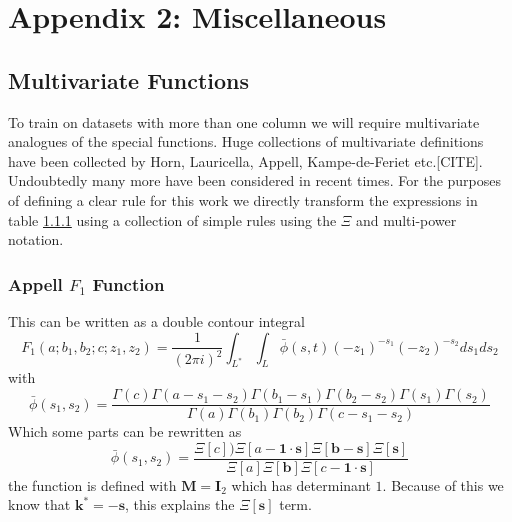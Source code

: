 \documentclass{article}
\begin{document}
\section{Appendix 2: Miscellaneous}
\subsection{Multivariate Functions}
To train on datasets with more than one column we will require multivariate analogues of the special functions. Huge collections of multivariate definitions have been collected by Horn, Lauricella, Appell, Kampe-de-Feriet etc.[CITE]. Undoubtedly many more have been considered in recent times. For the purposes of defining a clear rule for this work we directly transform the expressions in table \ref{} using a collection of simple rules using the $\Xi$ and multi-power notation.

\subsubsection{Appell $F_1$ Function}
This can be written as a double contour integral
\begin{equation}
F_1(a;b_1,b_2;c;z_1,z_2) = \frac{1}{(2\pi i)^2}\int_{L^*} \int_L  \bar{\phi}(s,t) (-z_1)^{-s_1}(-z_2)^{-s_2} ds_1 ds_2
\end{equation}
with \begin{equation}
\bar{\phi}(s_1,s_2) = \frac{\Gamma(c)\Gamma(a-s_1-s_2)\Gamma(b_1-s_1)\Gamma(b_2-s_2)\Gamma(s_1)\Gamma(s_2)}{\Gamma(a)\Gamma(b_1)\Gamma(b_2)\Gamma(c-s_1-s_2)}
\end{equation}
Which some parts can be rewritten as 
\begin{equation}
\bar{\phi}(s_1,s_2) = \frac{\Xi[c])\Xi[a-\mathbf{1}\cdot\mathbf{s}]\Xi[\mathbf{b}-\mathbf{s}]\Xi[\mathbf{s}]}{\Xi[a]\Xi[\mathbf{b}]\Xi[c-\mathbf{1}\cdot\mathbf{s}]}
\end{equation}
the function is defined with $\mathbf{M}=\mathbf{I}_2$ which has determinant $1$. Because of this we know that $\mathbf{k}^* = -\mathbf{s}$, this explains the $\Xi[\mathbf{s}]$ term.
\end{document}
